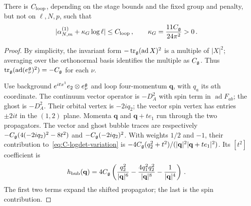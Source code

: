 \begin{lemma}\label{lem:C-one-loop}
There is $C_{\rm loop}$, depending on the stage bounds and the fixed group and penalty, but not on $\ell,N,p$, such that
\begin{equation}\label{eq:C-one-loop-bound}
 |\alpha^{(1)}_{N,m}+\kappa_G\log\ell|\le C_{\rm loop}\,,
 \qquad \kappa_G=\frac{11C_{\mathfrak{g}}}{24\pi^2}>0\,.
\end{equation}
\end{lemma}

\begin{proof}
By simplicity, the invariant form $-\operatorname{tr}_{\mathfrak{g}}(\operatorname{ad}X)^2$ is a multiple of $|X|^2$; averaging over the orthonormal basis identifies the multiple as $C_{\mathfrak{g}}$. Thus $\operatorname{tr}_{\mathfrak{g}}(\operatorname{ad}(e_\nu^{\mathfrak{g}})^2)=-C_{\mathfrak{g}}$ for each $\nu$.

Use background $e^{itx^1}e_2\otimes e_\nu^{\mathfrak{g}}$ and loop four-momentum $\mathbf q$, with $q_a$ its $a$th coordinate. The continuum vector operator is $-D_A^2$ with spin term in $\operatorname{ad}F_{ab}$; the ghost is $-D_A^2$. Their orbital vertex is $-2iq_2$; the vector spin vertex has entries $\pm2it$ in the $(1,2)$ plane. Momenta $\mathbf q$ and $\mathbf q+te_1$ run through the two propagators. The vector and ghost bubble traces are respectively $-C_{\mathfrak{g}}(4(-2iq_2)^2-8t^2)$ and $-C_{\mathfrak{g}}(-2iq_2)^2$. With weights $1/2$ and $-1$, their contribution to~\eqref{eq:C-logdet-variation} is $-4C_{\mathfrak{g}}(q_2^2+t^2)/(|\mathbf q|^2|\mathbf q+te_1|^2)$. Its $[t^2]$ coefficient is
\begin{equation}\label{eq:C-continuum-integrand}
 h_{\rm bub}(\mathbf q)=4C_{\mathfrak{g}}\left(\frac{q_2^2}{|\mathbf q|^6}-\frac{4q_1^2q_2^2}{|\mathbf q|^8}-\frac1{|\mathbf q|^4}\right)\,.
\end{equation}
The first two terms expand the shifted propagator; the last is the spin contribution.


\end{proof}
